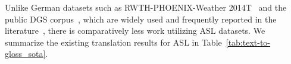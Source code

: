 Unlike German datasets such as RWTH-PHOENIX-Weather 2014T~\cite{camgoz_neural_2018} and the public DGS corpus~\cite{hanke2020extending}, which are widely used and frequently reported in the literature~\cite{chen2022two,yin2023gloss,li2020tspnet,saunders_progressive_2020}, there is comparatively less work utilizing ASL datasets. We summarize the existing translation results for ASL in Table~\ref{tab:text-to-gloss_sota}.


